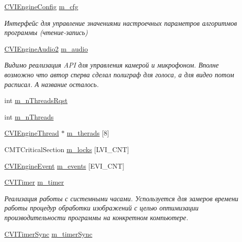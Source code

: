 \begin{DoxyCompactItemize}
\hyperlink{class_c_v_i_engine_config}{C\+V\+I\+Engine\+Config} \hyperlink{class_c_v_i_engine_base_a867f7342010985b0b21beb4feaf354b8}{m\+\_\+cfg}
\begin{DoxyCompactList}\small\item\em Интерфейс для управление значениями настроечных параметров алгоритмов программы (чтение-\/запись) \end{DoxyCompactList}\item 
\hyperlink{class_c_v_i_engine_audio2}{C\+V\+I\+Engine\+Audio2} \hyperlink{class_c_v_i_engine_base_af996670eec8597e3529bfd0a2ec2585e}{m\+\_\+audio}
\begin{DoxyCompactList}\small\item\em Видимо реализация A\+P\+I для управления камерой и микрофоном. Вполне возможно что автор сперва сделал полиграф для голоса, а для видео потом расписал. А название осталось. \end{DoxyCompactList}\item 
int \hyperlink{class_c_v_i_engine_base_a36e1cc3cb814a08af53e9b4076b51dae}{m\+\_\+n\+Threads\+Rqst}
\item 
int \hyperlink{class_c_v_i_engine_base_a0041ab05a40ba6a0bca65c78ea9d8189}{m\+\_\+n\+Threads}
\item 
\hyperlink{class_c_v_i_engine_thread}{C\+V\+I\+Engine\+Thread} $\ast$ \hyperlink{class_c_v_i_engine_base_a4fdf197fd70d474cf4365abba485c461}{m\+\_\+therads} \mbox{[}8\mbox{]}
\item 
C\+M\+T\+Critical\+Section \hyperlink{class_c_v_i_engine_base_a66562cd6aaf7fd0f9ade29c9096b9851}{m\+\_\+locks} \mbox{[}L\+V\+I\+\_\+\+C\+N\+T\mbox{]}
\item 
\hyperlink{class_c_v_i_engine_event}{C\+V\+I\+Engine\+Event} \hyperlink{class_c_v_i_engine_base_a88f59347ca703a36ea9965b96b3ab552}{m\+\_\+events} \mbox{[}E\+V\+I\+\_\+\+C\+N\+T\mbox{]}
\item 
\hyperlink{class_c_v_i_timer}{C\+V\+I\+Timer} \hyperlink{class_c_v_i_engine_base_a928c4511d2e46b9cd4b7c9b3b7322855}{m\+\_\+timer}
\begin{DoxyCompactList}\small\item\em Реализация работы с системными часами. Успользуется для замеров времени работы процедур обработки изображений с целью оптимизации производительности программы на конкретном компьютере. \end{DoxyCompactList}\item 
\hyperlink{class_c_v_i_timer_sync}{C\+V\+I\+Timer\+Sync} \hyperlink{class_c_v_i_engine_base_a8709ba629c654585cc38d13ccf3a23b8}{m\+\_\+timer\+Sync}

\end{DoxyCompactItemize}
